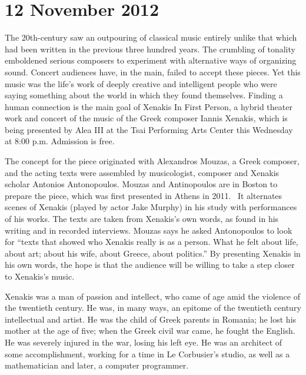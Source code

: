 \chapter{12 November 2012}

The 20th-century saw an outpouring of classical music entirely unlike that which had been written in the previous three hundred years. The crumbling of tonality emboldened serious composers to experiment with alternative ways of organizing sound. Concert audiences have, in the main, failed to accept these pieces. Yet this music was the life’s work of deeply creative and intelligent people who were saying something about the world in which they found themselves. Finding a human connection is the main goal of Xenakis In First Person, a hybrid theater work and concert of the music of the Greek composer Iannis Xenakis, which is being presented by Alea III at the Tsai Performing Arts Center this Wednesday at 8:00 p.m. Admission is free.

The concept for the piece originated with Alexandros Mouzas, a Greek composer, and the acting texts were assembled by musicologist, composer and Xenakis scholar Antonios Antonopoulos. Mouzas and Antinopoulos are in Boston to prepare the piece, which was first presented in Athens in 2011.  It alternates scenes of Xenakis (played by actor Jake Murphy) in his study with performances of his works. The texts are taken from Xenakis’s own words, as found in his writing and in recorded interviews. Mouzas says he asked Antonopoulos to look for “texts that showed who Xenakis really is as a person. What he felt about life, about art; about his wife, about Greece, about politics.” By presenting Xenakis in his own words, the hope is that the audience will be willing to take a step closer to Xenakis’s music.

Xenakis was a man of passion and intellect, who came of age amid the violence of the twentieth century. He was, in many ways, an epitome of the twentieth century intellectual and artist. He was the child of Greek parents in Romania; he lost his mother at the age of five; when the Greek civil war came, he fought the English. He was severely injured in the war, losing his left eye. He was an architect of some accomplishment, working for a time in Le Corbusier’s studio, as well as a mathematician and later, a computer programmer.

